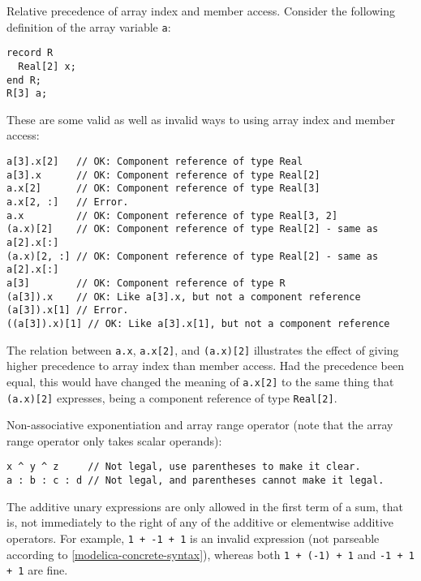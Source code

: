 \begin{example}
Relative precedence of array index and member access.
Consider the following definition of the array variable \lstinline!a!:
\begin{lstlisting}[language=modelica]
record R
  Real[2] x;
end R;
R[3] a;
\end{lstlisting}
These are some valid as well as invalid ways to using array index and member access:
\begin{lstlisting}[language=modelica]
a[3].x[2]   // OK: Component reference of type Real
a[3].x      // OK: Component reference of type Real[2]
a.x[2]      // OK: Component reference of type Real[3]
a.x[2, :]   // Error.
a.x         // OK: Component reference of type Real[3, 2]
(a.x)[2]    // OK: Component reference of type Real[2] - same as a[2].x[:]
(a.x)[2, :] // OK: Component reference of type Real[2] - same as a[2].x[:]
a[3]        // OK: Component reference of type R
(a[3]).x    // OK: Like a[3].x, but not a component reference
(a[3]).x[1] // Error.
((a[3]).x)[1] // OK: Like a[3].x[1], but not a component reference
\end{lstlisting}
The relation between \lstinline!a.x!, \lstinline!a.x[2]!, and \lstinline!(a.x)[2]! illustrates the effect of giving higher precedence to array index than member access.
Had the precedence been equal, this would have changed the meaning of \lstinline!a.x[2]! to the same thing that \lstinline!(a.x)[2]! expresses, being a component reference of type \lstinline!Real[2]!.
\end{example}

\begin{example}
Non-associative exponentiation and array range operator (note that the array range operator only takes scalar operands):
\begin{lstlisting}[language=modelica]
x ^ y ^ z     // Not legal, use parentheses to make it clear.
a : b : c : d // Not legal, and parentheses cannot make it legal.
\end{lstlisting}
\end{example}

The additive unary expressions are only allowed in the first term of a sum, that is, not immediately to the right of any of the additive or elementwise additive operators.
For example, \lstinline!1 + -1 + 1! is an invalid expression (not parseable according to \cref{modelica-concrete-syntax}), whereas both \lstinline!1 + (-1) + 1! and \lstinline!-1 + 1 + 1! are fine.

